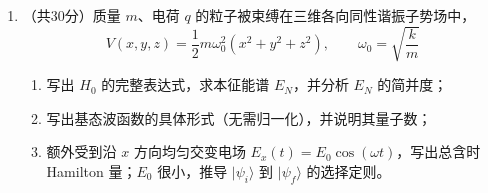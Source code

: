 \begin{enumerate}
{\begin{enumerate}
		\item 先由归一化确定 $A$：
		\begin{align*}
			1=\int_{-\infty}^{+\infty}|\psi(x,0)|^2\,dx=A^2\int_{-a}^{a}dx=2aA^2
		\end{align*}
		故归一化要求 $A=\dfrac{1}{\sqrt{2a}}$。以下推导对一般正实数 $A$ 均成立。

		计算初态的 Fourier 变换：
		\begin{align*}
			c(k)&=\frac{1}{\sqrt{2\pi}}\int_{-a}^{a}Ae^{-ikx}\,dx=\frac{A}{\sqrt{2\pi}}\cdot\frac{e^{ika}-e^{-ika}}{ik}\\
			&=\frac{A}{\sqrt{2\pi}}\cdot\frac{2\sin(ka)}{k}
		\end{align*}
		代入通解，得
		\begin{align*}
			\psi(x,t)&=\frac{1}{\sqrt{2\pi}}\int_{-\infty}^{+\infty}\frac{A}{\sqrt{2\pi}}\cdot\frac{2\sin(ka)}{k}\exp\!\left(ikx-\frac{i\hbar k^2}{2m}t\right)dk\\
			&=\frac{A}{\pi}\int_{-\infty}^{+\infty}\frac{\sin(ka)}{k}\exp\!\left(ikx-\frac{i\hbar k^2}{2m}t\right)dk
		\end{align*}

		等价地，利用自由粒子传播子 $K(x,t;x',0)=\sqrt{\dfrac{m}{2\pi i\hbar t}}\exp\!\left(\dfrac{im(x-x')^2}{2\hbar t}\right)$，可写为对初态支区间 $[-a,a]$ 的积分：
		\begin{align*}
			\psi(x,t)=\int_{-a}^{a}K(x,t;x',0)\psi(x',0)\,dx'=A\sqrt{\frac{m}{2\pi i\hbar t}}\int_{-a}^{a}\exp\!\left(\frac{im(x-x')^2}{2\hbar t}\right)dx'
		\end{align*}

		验证初条件：当 $t\to 0^+$ 时，
		\begin{align*}
			\psi(x,0^+)&=\frac{A}{\pi}\int_{-\infty}^{+\infty}\frac{\sin(ka)}{k}e^{ikx}\,dk=\frac{A}{2\pi}\int_{-\infty}^{+\infty}\int_{-a}^{a}e^{ik(x-x')}\,dx'\,dk\\
			&=A\int_{-a}^{a}\delta(x-x')\,dx'=\begin{cases}A,&|x|<a\\0,&|x|>a\end{cases}
		\end{align*}
		与给定的初态一致（端点 $x=\pm a$ 处取 Fourier 收敛值 $A/2$）。
	\end{enumerate}
	}

	\item
	（共30分）质量 $m$、电荷 $q$ 的粒子被束缚在三维各向同性谐振子势场中，
	\[
	V(x,y,z)=\frac{1}{2}m\omega_0^2(x^2+y^2+z^2),\qquad \omega_0=\sqrt{\frac{k}{m}}
	\]
	\begin{enumerate}
		\item 写出 $H_0$ 的完整表达式，求本征能谱 $E_N$，并分析 $E_N$ 的简并度；
		\item 写出基态波函数的具体形式（无需归一化），并说明其量子数；
		\item 额外受到沿 $x$ 方向均匀交变电场 $E_x(t)=E_0\cos(\omega t)$，写出总含时 Hamilton 量；$E_0$ 很小，推导 $|\psi_i\rangle$ 到 $|\psi_f\rangle$ 的选择定则。
	\end{enumerate}


\end{enumerate}
